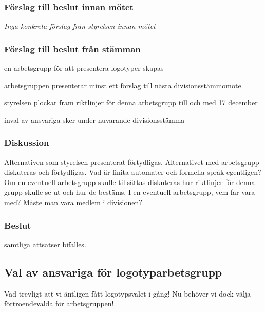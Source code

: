 \documentclass[protokoll]{dvd}
\begin{document}
\subsubsection*{Förslag till beslut innan mötet}

\emph{Inga konkreta förslag från styrelsen innan mötet}

\subsubsection*{Förslag till beslut från stämman}

\begin{attsatser}
    \item en arbetsgrupp för att presentera logotyper skapas
    \item arbetsgruppen presenterar minst ett förslag till nästa divisionsstämmomöte
    \item styrelsen plockar fram riktlinjer för denna arbetsgrupp till och med 17 december
    \item inval av ansvariga sker under nuvarande divisionsstämma
\end{attsatser}

\subsubsection*{Diskussion}
   Alternativen som styrelsen presenterat förtydligas. Alternativet med arbetsgrupp diskuteras och förtydligas. Vad är finita automater och formella språk egentligen? Om en eventuell arbetsgrupp skulle tillsättas diskuteras hur riktlinjer för denna grupp skulle se ut och hur de bestäms. I en eventuell arbetsgrupp, vem får vara med? Måste man vara medlem i divisionen?

\subsubsection*{Beslut}
    \begin{attsatser}
        \item samtliga attsatser bifalles.
    \end{attsatser}

\newpage

\subsection{Val av ansvariga för logotyparbetsgrupp}
    Vad trevligt att vi äntligen fått logotypsvalet i gång! Nu behöver vi dock välja förtroendevalda för arbetsgruppen!
\end{document}
